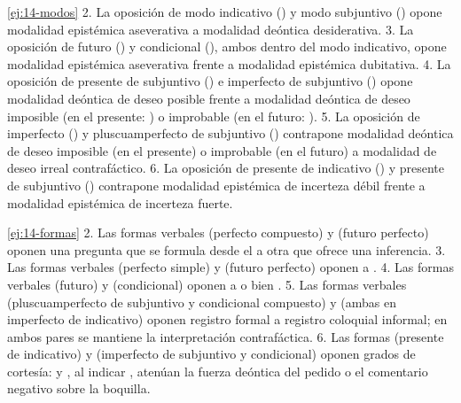 \begin{solucion}{\ref{ej:14-modos}}
2. La oposición de modo indicativo () y modo subjuntivo
() opone modalidad epistémica aseverativa a modalidad deóntica
desiderativa. 3. La oposición de futuro () y condicional
(), ambos dentro del modo indicativo, opone modalidad
epistémica aseverativa frente a modalidad epistémica dubitativa. 4. La oposición
de presente de subjuntivo () e imperfecto de subjuntivo
() opone modalidad deóntica de deseo posible frente a modalidad
deóntica de deseo imposible (en el presente: ) o
improbable (en el futuro: ). 5. La
oposición de imperfecto () y pluscuamperfecto de subjuntivo
() contrapone modalidad deóntica de deseo imposible (en el
presente) o improbable (en el futuro) a modalidad de deseo irreal
contrafáctico. 6. La oposición de presente de indicativo () y
presente de subjuntivo () contrapone modalidad epistémica de
incerteza débil frente a modalidad epistémica de incerteza fuerte.
\end{solucion}

\begin{solucion}{\ref{ej:14-formas}}
2. Las formas verbales  (perfecto compuesto) y 
(futuro perfecto) oponen una pregunta que se formula desde el
 a otra que ofrece una inferencia. 3. Las formas verbales
 (perfecto simple) y  (futuro perfecto)
oponen  a . 4. Las formas
verbales  (futuro) y  (condicional) oponen
 a  o bien
. 5. Las formas verbales  (pluscuamperfecto de subjuntivo y condicional compuesto) y
 (ambas en imperfecto de indicativo) oponen registro formal
a registro coloquial informal; en ambos pares se mantiene la interpretación
contrafáctica. 6. Las formas  (presente de indicativo) y
 (imperfecto de subjuntivo y condicional)
oponen grados de cortesía:  y , al
indicar , atenúan la fuerza deóntica del pedido o el comentario
negativo sobre la boquilla.
\end{solucion}

